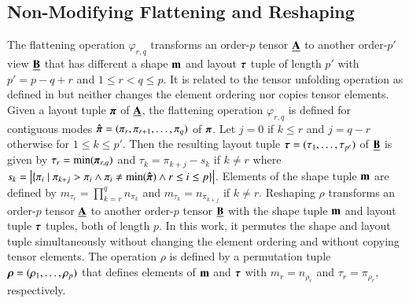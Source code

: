 \subsection{Non-Modifying Flattening and Reshaping}
\label{sec:preliminaries:flattening.reshaping}
The flattening operation $\varphi_{r,q}$ transforms an order-$p$ tensor $\underline{\mathbf{A}}$ to another order-$p'$ view $\underline{\mathbf{B}}$ that has different a shape $\mathbf{m}$ and layout $\boldsymbol{\tau}$ tuple of length $p'$ with $p' = p-q+r$ and $1 \leq r < q \leq p$.
It is related to the tensor unfolding operation as defined in \cite[p.459]{kolda:2009:decompositions} but neither changes the element ordering nor copies tensor elements.
Given a layout tuple $\boldsymbol{\pi}$ of $\underline{\mathbf{A}}$, the flattening operation $\varphi_{r,q}$ is defined for contiguous modes $\boldsymbol{\hat{\pi}} = (\pi_r,\pi_{r+1}, \dots, \pi_{q})$ of $\boldsymbol{\pi}$.
Let $j = 0$ if $k \leq r$ and $j = q-r$ otherwise for $1 \leq k \leq p'$.
Then the resulting layout tuple $\boldsymbol{\tau} = (\tau_1,\dots,\tau_{p'})$ of $\underline{\mathbf{B}}$ is given by $\tau_r = \min(\boldsymbol{\pi}_{r,q})$ and $\tau_{k} = \pi_{k+j} - s_k$ if $k \neq r$ where $s_k = \left| \{ \pi_i \mid \pi_{k+j} > \pi_i \wedge \pi_i \neq \min(\boldsymbol{\hat{\pi}}) \wedge r \leq i \leq p \} \right|$.
Elements of the shape tuple $\mathbf{m}$ are defined by $m_{\tau_r} = \prod_{k=r}^q n_{\pi_k}$ and $m_{\tau_k} = n_{\pi_{k+j}}$ if $k \neq r$.
Reshaping $\rho$ transforms an order-$p$ tensor $\underline{\mathbf{A}}$ to another order-$p$ tensor $\underline{\mathbf{B}}$ with the shape tuple $\mathbf{m}$ and layout tuple $\boldsymbol{\tau}$ tuples, both of length $p$.
In this work, it permutes the shape and layout tuple simultaneously without changing the element ordering and without copying tensor elements.
The operation $\rho$ is defined by a permutation tuple $\boldsymbol{\rho} = (\rho_1,\dots,\rho_p)$ that defines elements of $\mathbf{m}$ and $\boldsymbol{\tau}$ with $m_r = n_{\rho_r}$ and $\tau_r = \pi_{\rho_r}$, respectively.

